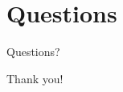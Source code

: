 \documentclass[pdf]{beamer}
\begin{document}

\section{Questions}

\begin{frame}
\tableofcontents[currentsection]
\end{frame}

\begin{frame}
\centering
Questions?
\end{frame}

\begin{frame}
\centering
Thank you!
\end{frame}
\end{document}
